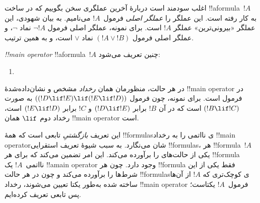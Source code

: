 \documentclass[../../../include/open-logic-section]{subfiles}
\begin{document}


\begin{explain}
اغلب سودمند است دربارهٔ آخرین عملگری سخن بگوییم که در ساخت
!!a{formula}~$!A$ به کار رفته است. این عملگر را \emph{عملگر اصلی}
فرمول~$!A$ می‌نامیم. به بیان شهودی، این عملگر «بیرونی‌ترین» عملگر $!A$ است.
برای نمونه، عملگر اصلی فرمول $\lnot !A$ نماد $\lnot$، و عملگر اصلی فرمول
$(!A \lor !B)$ نماد $\lor$ است، و به همین ترتیب.
\end{explain}


\begin{defn}
\emph{!!{main operator}} !!a{formula}~$!A$ چنین تعریف می‌شود:
\begin{enumerate}
\item {}







\end{enumerate}
\end{defn}

در هر حالت، منظورمان همان \emph{رخداد} مشخص و نشان‌داده‌شدهٔ
!!{main operator} در فرمول است. برای نمونه، چون فرمول
$((!D \lif !E) \lif (!E \lif !D))$ به صورت $(!B \lif !C)$ است که در آن
$!B$ برابر $(!D \lif !E)$ و $!C$ برابر $(!E \lif !D)$ است، رخداد دوم
$\lif$ همان !!{main operator} است.

\begin{explain}
این تعریف \emph{بازگشتیِ} تابعی است که همهٔ !!{formula}sی نااتمی را به
رخداد !!{main operator}شان می‌نگارد. به سبب شیوهٔ تعریف استقرایی
!!{formula}s، هر !!{formula}~$!A$ یکی از حالت‌های
 را برآورده می‌کند. این امر تضمین می‌کند که برای هر
!!{formula} نااتمی~$!A$ یک !!a{main operator} وجود دارد. چون هر
!!{formula} فقط یکی از این شرط‌ها را برآورده می‌کند و چون در هر حالت
!!{formula}sی کوچک‌تری که $!A$ از آن‌ها ساخته شده به‌طور یکتا تعیین
می‌شوند، رخداد !!{main operator} فرمول~$!A$ یکتاست؛ پس تابعی تعریف کرده‌ایم.
\end{explain}
\end{document}
